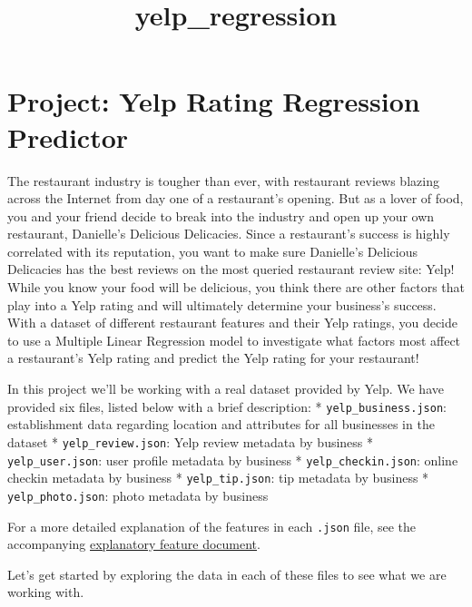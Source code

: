 \documentclass[11pt]{article}
\title{yelp\_regression}
\begin{document}
    
    
    \maketitle
    
    

    
    \hypertarget{project-yelp-rating-regression-predictor}{%
\section{Project: Yelp Rating Regression
Predictor}\label{project-yelp-rating-regression-predictor}}

The restaurant industry is tougher than ever, with restaurant reviews
blazing across the Internet from day one of a restaurant's opening. But
as a lover of food, you and your friend decide to break into the
industry and open up your own restaurant, Danielle's Delicious
Delicacies. Since a restaurant's success is highly correlated with its
reputation, you want to make sure Danielle's Delicious Delicacies has
the best reviews on the most queried restaurant review site: Yelp! While
you know your food will be delicious, you think there are other factors
that play into a Yelp rating and will ultimately determine your
business's success. With a dataset of different restaurant features and
their Yelp ratings, you decide to use a Multiple Linear Regression model
to investigate what factors most affect a restaurant's Yelp rating and
predict the Yelp rating for your restaurant!

In this project we'll be working with a real dataset provided by Yelp.
We have provided six files, listed below with a brief description: *
\texttt{yelp\_business.json}: establishment data regarding location and
attributes for all businesses in the dataset *
\texttt{yelp\_review.json}: Yelp review metadata by business *
\texttt{yelp\_user.json}: user profile metadata by business *
\texttt{yelp\_checkin.json}: online checkin metadata by business *
\texttt{yelp\_tip.json}: tip metadata by business *
\texttt{yelp\_photo.json}: photo metadata by business

For a more detailed explanation of the features in each \texttt{.json}
file, see the accompanying
\href{https://docs.google.com/document/d/1V6FjJpKspVBOOBs4E7fBfp_yzHn0--XJkC2uUtWuRgM/edit}{explanatory
feature document}.

Let's get started by exploring the data in each of these files to see
what we are working with.
\end{document}
